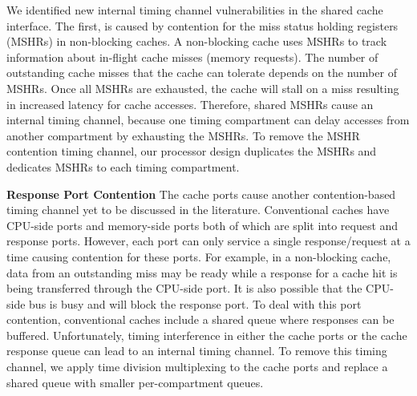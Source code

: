 We identified new internal timing channel vulnerabilities in the shared cache 
interface. The first, is caused by contention for the miss status holding 
registers (MSHRs) in non-blocking caches.
A non-blocking cache uses MSHRs to track information about in-flight cache misses 
(memory requests).
The number of outstanding cache misses that the cache can tolerate depends on 
the number of MSHRs. Once all MSHRs are exhausted, the cache will stall on
a miss resulting in increased latency for cache accesses.
Therefore, shared MSHRs cause an internal timing channel, because one timing
compartment can delay accesses from another compartment by exhausting the MSHRs.
To remove the MSHR contention timing channel, our processor design duplicates
the MSHRs and dedicates MSHRs to each timing compartment.

\textbf{Response Port Contention}
The cache ports cause another contention-based timing channel yet to be 
discussed in the literature. Conventional caches have CPU-side ports and 
memory-side ports both of which are split into request and response ports. 
However, each port can only service a single response/request at a time
causing contention for these ports. For example, in a non-blocking cache,
data from an outstanding miss may be ready while a response for a cache hit
is being transferred through the CPU-side port.
It is also possible that the CPU-side bus is busy and will block the response
port. 
To deal with this port contention, conventional caches include a shared queue
where responses can be buffered. Unfortunately, 
timing interference in either the cache ports or the cache response queue can
lead to an internal timing channel. To remove this timing channel, we apply
time division multiplexing to the cache ports and replace a shared queue with
smaller per-compartment queues.

